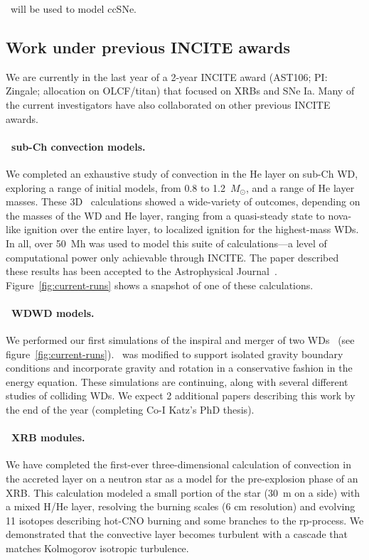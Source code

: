 \documentclass[11pt,letterpaper,english]{article}
\begin{document}
\chimera\ will be used to model ccSNe.  

\subsection{Work under previous INCITE awards}

We are currently in the last year of a 2-year INCITE award (AST106;
PI: Zingale; allocation on OLCF/titan) that focused on XRBs and SNe
Ia.  Many of the current investigators have also collaborated on other
previous INCITE awards.  

\paragraph{\maestro\ sub-Ch convection models.}
%
We completed an exhaustive study of convection in the He layer
on  sub-Ch WD, exploring a range of initial
models, from 0.8 to 1.2~$M_\odot$, and a range of He layer masses.
These 3D \maestro\ calculations showed a wide-variety of outcomes,
depending on the masses of the WD and He layer, ranging from a
quasi-steady state to nova-like ignition over the entire layer, to
localized ignition for the highest-mass WDs.  In all, over 50~Mh was
used to model this suite of calculations---a level of computational
power only achievable through INCITE.  The paper described these
results has been accepted to the Astrophysical
Journal~\cite{jacobs:2016}.  Figure~\ref{fig:current-runs} shows a
snapshot of one of these calculations.

\paragraph{\castro\ WDWD models.}
%
We performed our first \castro simulations of the inspiral and
merger  of two WDs~\cite{katz:2016} (see
figure~\ref{fig:current-runs}).  \castro\ was modified to support
isolated gravity boundary conditions and incorporate gravity and
rotation in a conservative fashion in the energy equation.  These 
simulations are continuing, along with several different studies
of colliding WDs.  We expect 2 additional papers describing this
work by the end of the year (completing Co-I Katz's PhD thesis).




\paragraph{\maestro\ XRB modules.}
%
We have completed the first-ever three-dimensional calculation of
convection in the accreted layer on a neutron star as a model for the
pre-explosion phase of an XRB.  This calculation modeled a small
portion of the star (30~m on a side) with a mixed H/He layer,
resolving the burning scales (6 cm resolution) and evolving 11
isotopes describing hot-CNO burning and some branches to the
rp-process.  We demonstrated that the convective layer becomes
turbulent with a cascade that matches Kolmogorov isotropic turbulence.
\end{document}
